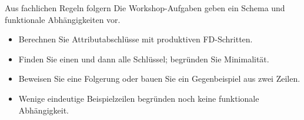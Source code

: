 \begin{frame}[t]{Aus fachlichen Regeln folgern}
Die Workshop-Aufgaben geben ein Schema und funktionale Abhängigkeiten vor.
\medskip
\begin{itemize}
\item Berechnen Sie Attributabschlüsse mit produktiven FD-Schritten.
\item Finden Sie einen und dann alle Schlüssel; begründen Sie Minimalität.
\item Beweisen Sie eine Folgerung oder bauen Sie ein Gegenbeispiel aus zwei Zeilen.
\item Wenige eindeutige Beispielzeilen begründen noch keine funktionale Abhängigkeit.
\end{itemize}
\end{frame}
